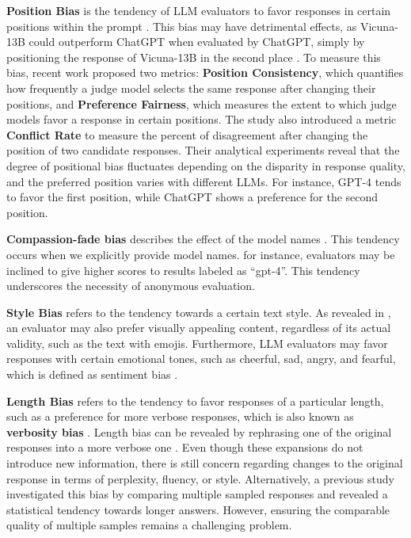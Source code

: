\documentclass[acmsmall,screen]{acmart}
\begin{document}
\textbf{Position Bias} is the tendency of LLM evaluators to favor responses in certain positions within the prompt \cite{wang-etal-2024-large-language-models-fair, thakur2024judging, shi2024judging, ye2024justice}. 
This bias may have detrimental effects, as Vicuna-13B could outperform ChatGPT when evaluated by ChatGPT, simply by positioning the response of Vicuna-13B in the second place \cite{wang-etal-2024-large-language-models-fair}.
To measure this bias, recent work \cite{shi2024judging} proposed two metrics: \textbf{Position Consistency}, which quantifies how frequently a judge model selects the same response after changing their positions, and \textbf{Preference Fairness}, which measures the extent to which judge models favor a response in certain positions.
The study \cite{wang-etal-2024-large-language-models-fair} also introduced a metric \textbf{Conflict Rate} to measure the percent of disagreement after changing the position of two candidate responses.
Their analytical experiments reveal that the degree of positional bias fluctuates depending on the disparity in response quality, and the preferred position varies with different LLMs. 
For instance, GPT-4 tends to favor the first position, while ChatGPT shows a preference for the second position.



\textbf{Compassion-fade bias} describes the  effect of the model names \citep{koo2023benchmarking, ye2024justice}. 
This tendency occurs when we explicitly provide model names. 
for instance, evaluators may be inclined to give higher scores to results labeled as ``gpt-4''. 
This tendency underscores the necessity of anonymous evaluation.

\textbf{Style Bias} refers to the tendency towards a certain text style.
As revealed in \cite{chen2024humans}, an evaluator may also prefer visually appealing content, regardless of its actual validity, such as the text with emojis.
Furthermore, LLM evaluators may favor responses with certain emotional tones, such as cheerful, sad, angry, and fearful, which is defined as sentiment bias \cite{ye2024justice,li2023examining}.

\textbf{Length Bias} refers to the tendency to favor responses of a particular length, such as a preference for more verbose responses, which is also known as \textbf{verbosity bias}  \cite{offsetbias, huang2024_finetuned_judge, nips_llm_as_a_judge, ye2024justice}. 
Length bias can be revealed by rephrasing one of the original responses into a more verbose one \cite{ye2024justice, nips_llm_as_a_judge}. 
Even though these expansions do not introduce new information, there is still concern regarding changes to the original response in terms of perplexity, fluency, or style.
Alternatively, a previous study \cite{saito2023verbosity} investigated this bias by comparing multiple sampled responses and revealed a statistical tendency towards longer answers. 
However, ensuring the comparable quality of multiple samples remains a challenging problem.
\end{document}
